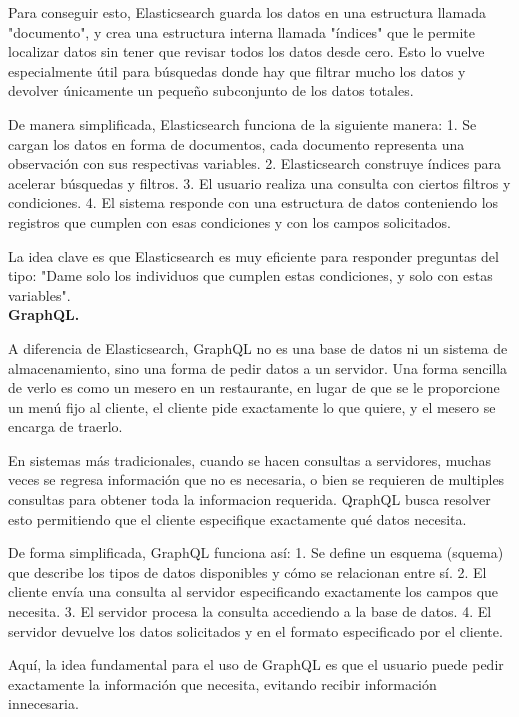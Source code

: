 \documentclass[
 12pt,
 letterpaper,
]{article}
\theoremstyle{teoremaBreak}
\theoremstyle{plain}
\theoremstyle{definition}
\begin{document}
Para conseguir esto, Elasticsearch guarda los datos en una estructura llamada "documento", y crea una estructura 
interna llamada "índices" que le permite localizar datos sin tener que revisar todos los datos desde cero. Esto lo vuelve 
especialmente útil para búsquedas donde hay que filtrar mucho los datos y devolver únicamente un pequeño subconjunto 
de los datos totales.

De manera simplificada, Elasticsearch funciona de la siguiente manera:
1. Se cargan los datos en forma de documentos, cada documento representa una observación con sus respectivas variables.
2. Elasticsearch construye índices para acelerar búsquedas y filtros.
3. El usuario realiza una consulta con ciertos filtros y condiciones.
4. El sistema responde con una estructura de datos conteniendo los registros que cumplen con esas condiciones y 
con los campos solicitados.

La idea clave es que Elasticsearch es muy eficiente para responder preguntas del tipo: "Dame solo los individuos 
que cumplen estas condiciones, y solo con estas variables".\\

\textbf{GraphQL.}

A diferencia de Elasticsearch, GraphQL no es una base de datos ni un sistema de almacenamiento, sino una forma de 
pedir datos a un servidor. Una forma sencilla de verlo es como un mesero en un restaurante, en lugar de que 
se le proporcione un menú fijo al cliente, el cliente pide exactamente lo que quiere, y el mesero se encarga de traerlo.

En sistemas más tradicionales, cuando se hacen consultas a servidores, muchas veces se regresa información que no es 
necesaria, o bien se requieren de multiples consultas para obtener toda la informacion requerida. QraphQL busca resolver 
esto permitiendo que el cliente especifique exactamente qué datos necesita.

De forma simplificada, GraphQL funciona así:
1. Se define un esquema (squema) que describe los tipos de datos disponibles y cómo se relacionan entre sí.
2. El cliente envía una consulta al servidor especificando exactamente los campos que necesita.
3. El servidor procesa la consulta accediendo a la base de datos.
4. El servidor devuelve los datos solicitados y en el formato especificado por el cliente.

Aquí, la idea fundamental para el uso de GraphQL es que el usuario puede pedir exactamente la información que necesita, 
evitando recibir información innecesaria.\\
\end{document}
